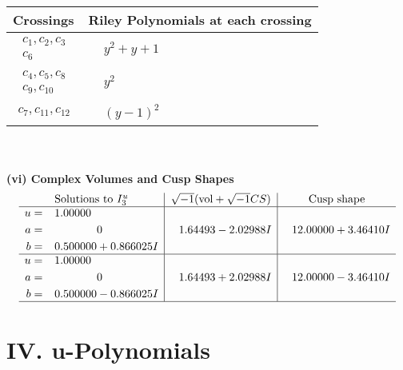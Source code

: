 \documentclass[1p]{elsarticle_modified}
\theoremstyle{definition}
\newcommand{\I}{\sqrt{-1}}
\begin{document}
\begin{tabular}{m{50pt}|m{274pt}}
Crossings & \hspace{64pt}Riley Polynomials at each crossing \\
\hline $$\begin{aligned}c_{1},c_{2},c_{3}\\c_{6}\end{aligned}$$&$\begin{aligned}
&y^2+y+1
\end{aligned}$\\
\hline $$\begin{aligned}c_{4},c_{5},c_{8}\\c_{9},c_{10}\end{aligned}$$&$\begin{aligned}
&y^2
\end{aligned}$\\
\hline $$\begin{aligned}c_{7},c_{11},c_{12}\end{aligned}$$&$\begin{aligned}
&(y-1)^2
\end{aligned}$\\
\hline
\end{tabular}\\~\\
\newpage\flushleft \textbf{(vi) Complex Volumes and Cusp Shapes}
$$\begin{array}{c|c|c}  
\text{Solutions to }I^u_{3}& \I (\text{vol} + \sqrt{-1}CS) & \text{Cusp shape}\\
 \hline 
\begin{aligned}
u &= \phantom{-}1.00000\phantom{ +0.000000I} \\
a &= \phantom{-0.000000 } 0 \\
b &= \phantom{-}0.500000 + 0.866025 I\end{aligned}
 & \phantom{-}1.64493 - 2.02988 I & \phantom{-}12.00000 + 3.46410 I \\ \hline\begin{aligned}
u &= \phantom{-}1.00000\phantom{ +0.000000I} \\
a &= \phantom{-0.000000 } 0 \\
b &= \phantom{-}0.500000 - 0.866025 I\end{aligned}
 & \phantom{-}1.64493 + 2.02988 I & \phantom{-}12.00000 - 3.46410 I\\
 \hline 
 \end{array}$$\newpage
\newpage\renewcommand{\arraystretch}{1}
\centering \section*{ IV. u-Polynomials}
\end{document}
